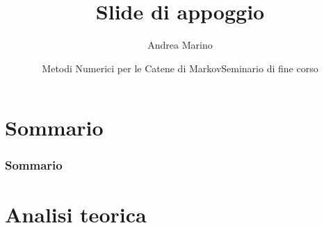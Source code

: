 \documentclass[10pt,xcolor={table,dvipsnames}]{beamer} 		%
\title[Seminario MNCM]{Slide di appoggio}			%
\author{Andrea Marino}
\institute[DI UniPi]{Università di Pisa}
\date[\today]{Metodi Numerici per le Catene di Markov\newline Seminario di fine corso}
\theoremstyle{plain}					%
\theoremstyle{definition}
\theoremstyle{remark}
\begin{document}
    \begin{frame}[plain]
        \titlepage
    \end{frame}

\section*{Sommario}
	\setcounter{tocdepth}{1}
	\begin{frame}
		\frametitle{Sommario}
		\tableofcontents
	\end{frame}
	
	\setcounter{tocdepth}{2}  
    
\section{Analisi teorica}
\end{document}
